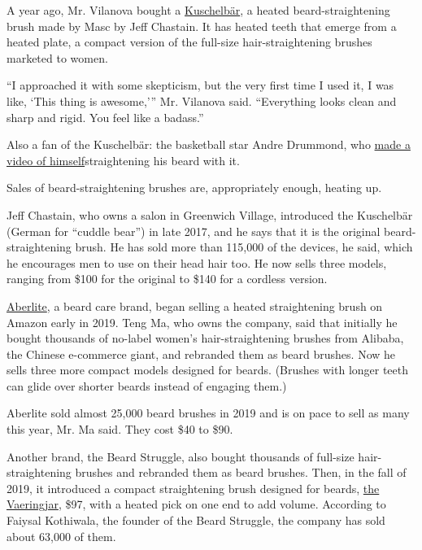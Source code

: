 A year ago, Mr. Vilanova bought a
\href{https://www.mascbyjeffchastain.com/collections/shop-all/products/kuschelbar\%C2\%AE-hair-and-beard-straightener}{Kuschelbär},
a heated beard-straightening brush made by Masc by Jeff Chastain. It has
heated teeth that emerge from a heated plate, a compact version of the
full-size hair-straightening brushes marketed to women.

``I approached it with some skepticism, but the very first time I used
it, I was like, `This thing is awesome,''' Mr. Vilanova said.
``Everything looks clean and sharp and rigid. You feel like a badass.''

Also a fan of the Kuschelbär: the basketball star Andre Drummond, who
\href{https://www.facebookcorewwwi.onion/MASCbyjeffchastain/videos/nba-and-detroitpistons-star-andredrummondd-reached-out-to-me-a-couple-weeks-ago-/598722770629116/}{made
a video of himself}straightening his beard with it.

Sales of beard-straightening brushes are, appropriately enough, heating
up.

Jeff Chastain, who owns a salon in Greenwich Village, introduced the
Kuschelbär (German for ``cuddle bear'') in late 2017, and he says that
it is the original beard-straightening brush. He has sold more than
115,000 of the devices, he said, which he encourages men to use on their
head hair too. He now sells three models, ranging from \$100 for the
original to \$140 for a cordless version.

\href{https://www.aberlite.com/}{Aberlite}, a beard care brand, began
selling a heated straightening brush on Amazon early in 2019. Teng Ma,
who owns the company, said that initially he bought thousands of
no-label women's hair-straightening brushes from Alibaba, the Chinese
e-commerce giant, and rebranded them as beard brushes. Now he sells
three more compact models designed for beards. (Brushes with longer
teeth can glide over shorter beards instead of engaging them.)

Aberlite sold almost 25,000 beard brushes in 2019 and is on pace to sell
as many this year, Mr. Ma said. They cost \$40 to \$90.

Another brand, the Beard Struggle, also bought thousands of full-size
hair-straightening brushes and rebranded them as beard brushes. Then, in
the fall of 2019, it introduced a compact straightening brush designed
for beards,
\href{https://www.thebeardstruggle.com/collections/beard-care-products/products/ulfberht-heated-beard-comb}{the
Vaeringjar}, \$97, with a heated pick on one end to add volume.
According to Faiysal Kothiwala, the founder of the Beard Struggle, the
company has sold about 63,000 of them.

